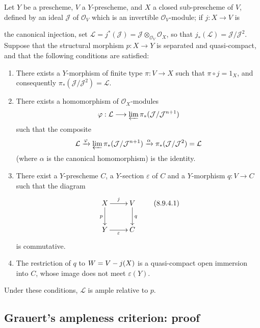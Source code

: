 \begin{proposition}[8.9.4]
\label{II.8.9.4}
Let $Y$ be a prescheme, $V$ a $Y$-prescheme, and $X$ a closed sub-prescheme of
$V$, defined by an ideal $\mathcal{J}$ of $\mathcal{O}_V$ which is an
\textup{invertible} $\mathcal{O}_V$-module; if $j:X\to V$ is

the canonical injection, set
$\mathcal{L}=j^*(\mathcal{J})=
\mathcal{J}\otimes_{\mathcal{O}_V}\mathcal{O}_X$, so that
$j_*(\mathcal{L})=\mathcal{J}/\mathcal{J}^2$. Suppose that the structural
morphism $p:X\to Y$ is separated and quasi-compact, and that the following
conditions are satisfied:
\begin{enumerate}
  \item[\rm{(i)}] There exists a $Y$-morphism of finite type $\pi:V\to X$
  such that $\pi\circ j=1_X$, and consequently
  $\pi_*(\mathcal{J}/\mathcal{J}^2)=\mathcal{L}$.
  \item[\rm{(ii)}] There exists a homomorphism of $\mathcal{O}_X$-modules
  \[
    \varphi:\mathcal{L}\longrightarrow
    \varprojlim\pi_*(\mathcal{J}/\mathcal{J}^{n+1})
  \]
  such that the composite
  \[
    \mathcal{L}\xrightarrow{\varphi}
    \varprojlim\pi_*(\mathcal{J}/\mathcal{J}^{n+1})
    \xrightarrow{\alpha}\pi_*(\mathcal{J}/\mathcal{J}^2)=\mathcal{L}
  \]
  (where $\alpha$ is the canonical homomorphism) is the identity.
  \item[\rm{(iii)}] There exist a $Y$-prescheme $C$, a $Y$-section
  $\varepsilon$ of $C$ and a $Y$-morphism $q:V\to C$ such that the diagram
  \begin{equation}
  \label{II.8.9.4.1}
    \xymatrix{
      X\ar[r]^{j}\ar[d]_{p} & V\ar[d]^{q}\\
      Y\ar[r]_{\varepsilon} & C
    }
  \tag{8.9.4.1}
  \end{equation}
  is commutative.
  \item[\rm{(iv)}] The restriction of $q$ to $W=V- j(X)$ is a quasi-compact
  open immersion into $C$, whose image does not meet
  $\varepsilon(Y)$.
\end{enumerate}
Under these conditions, $\mathcal{L}$ is ample relative to $p$.
\end{proposition}


\subsection{Grauert's ampleness criterion: proof}
\label{subsection:II.8.10}

